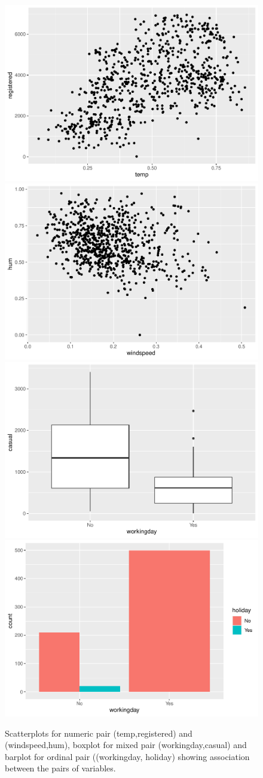 \begin{figure}
\includegraphics[width=0.5\linewidth]{rjpaperCHMar22_files/figure-latex/int-pairs-bike-1} \includegraphics[width=0.5\linewidth]{rjpaperCHMar22_files/figure-latex/int-pairs-bike-2} \includegraphics[width=0.5\linewidth]{rjpaperCHMar22_files/figure-latex/int-pairs-bike-3} \includegraphics[width=0.5\linewidth]{rjpaperCHMar22_files/figure-latex/int-pairs-bike-4} \caption{Scatterplots for numeric pair (temp,registered) and (windspeed,hum),  boxplot for mixed pair (workingday,casual) and barplot for ordinal pair ((workingday, holiday) showing association between the pairs of variables.}\label{fig:int-pairs-bike}
\end{figure}

